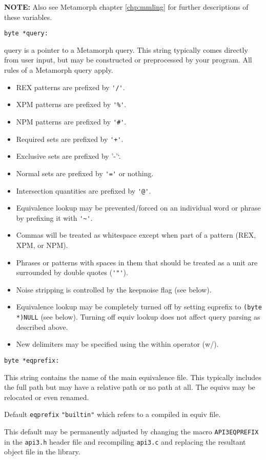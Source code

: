 {\bf NOTE:}  Also see Metamorph chapter \ref{chp:mmling} for
further descriptions of these variables.
\begin{verbatim}
byte *query:
\end{verbatim}
query is a pointer to a Metamorph query.  This string typically
comes directly from user input, but may be constructed or
preprocessed by your program.  All rules of a Metamorph query
apply.
\begin{itemize}
\item REX patterns are prefixed by \verb`'/'`.
\item XPM patterns are prefixed by \verb`'%'`.
\item NPM patterns are prefixed by \verb`'#'`.
\item Required sets are prefixed by \verb`'+'`.
\item Exclusive sets are prefixed by \verb``'-'`.
\item Normal sets are prefixed by \verb`'='` or nothing.
\item Intersection quantities are prefixed by \verb`'@'`.
\item Equivalence lookup may be prevented/forced on an individual
word or phrase by prefixing it with \verb`'~'`.
\item Commas will be treated as whitespace except when part of a pattern
(REX, XPM, or NPM).
\item Phrases or patterns with spaces in them that should be treated
as a unit are surrounded by double quotes (\verb`'"'`).
\item Noise stripping is controlled by the keepnoise flag (see below).
\item Equivalence lookup may be completely turned off by setting eqprefix
to \verb`(byte *)NULL` (see below). Turning off equiv lookup does not
affect query parsing as described above.
\item New delimiters may be specified using the within operator (w/).
\end{itemize}

\begin{verbatim}
byte *eqprefix:
\end{verbatim}
This string contains the name of the main equivalence file.  This
typically includes the full path but may have a relative path or
no path at all.  The equivs may be relocated or even renamed.

Default \verb`eqprefix` \verb`"builtin"` which refers to a compiled in equiv
file.

This default may be permanently adjusted by changing the macro
\verb`API3EQPREFIX` in the \verb`api3.h` header file and recompiling \verb`api3.c` and
replacing the resultant object file in the library.

